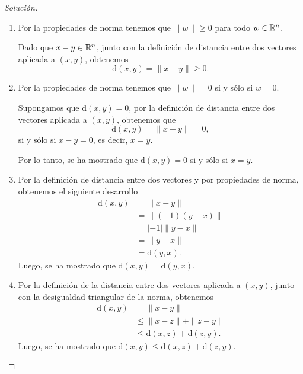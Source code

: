 \documentclass[a4,11pt]{aleph-notas}
\begin{document}
\begin{proof}[Solución]\hspace{0pt}
    \begin{enumerate}
        \item 
        Por la propiedades de norma tenemos que $\|w\|\geq0$ para todo $w\in\mathbb{R}^n$.
        
        Dado que $x-y\in\mathbb{R}^n$, junto con la definición de distancia entre dos vectores aplicada a $(x,y)$, obtenemos
        \[
            \text{d}(x,y) = \|x - y\| \geq 0.
        \]
        \item
        Por la propiedades de norma tenemos que $\|w\| = 0$ si y sólo si $w=0$.
        
        Supongamos que $\text{d}(x,y)=0$, por la definición de distancia entre dos vectores aplicada a $(x,y)$, obtenemos que 
        \[
            \text{d}(x,y) = \|x - y\| = 0,
        \]
        si y sólo si $x - y = 0$, es decir, $x=y$.
        
        Por lo tanto, se ha mostrado que $\text{d}(x,y) = 0$ si y sólo si $x=y$.
        \item
        Por la definición de distancia entre dos vectores y por propiedades de norma, obtenemos el siguiente desarrollo
        \begin{align*}
            \text{d}(x,y) &= \|x-y\|\\
                          &= \|(-1)(y-x)\|\\
                          &= |-1|\|y-x\|\\
                          &= \|y-x\|\\
                          &= \text{d}(y,x).
        \end{align*}
        Luego, se ha mostrado que $\text{d}(x,y) =\text{d}(y,x)$.
        \item 
        Por la definición de la distancia entre dos vectores aplicada a $(x,y)$, junto con la desigualdad triangular de la norma, obtenemos
        \begin{align*}
            \text{d}(x, y) &= \|x-y\|\\
                           &\leq \|x-z\| + \|z-y\|\\
                           &\leq \text{d}(x, z) + \text{d}(z,y).
        \end{align*}
        Luego, se ha mostrado que $\text{d}(x, y) \leq \text{d}(x, z) + \text{d}(z,y)$.
    \end{enumerate}
\end{proof}
    
\end{document}

